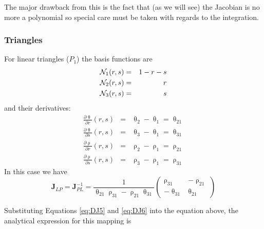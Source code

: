 The major drawback from this is the fact that (as we will see) the Jacobian is no more a polynomial
so special care must be taken with regards to the integration.

\subsubsection{Triangles}

For linear triangles ($P_1$) the basis functions are
\begin{eqnarray}
{\mathcal{N}}_1(r,s)&=&1-r-s \\
{\mathcal{N}}_2(r,s)&=&r \\
{\mathcal{N}}_3(r,s)&=&s
\end{eqnarray}
and their derivatives:
\begin{eqnarray}
\frac{\partial\uptheta}{\partial r}(r,s) &=& \uptheta_2-\uptheta_1 = \uptheta_{21}\\
\frac{\partial\uptheta}{\partial s}(r,s) &=& \uptheta_3-\uptheta_1 = \uptheta_{31}\\
\frac{\partial\uprho}{\partial r}(r,s) &=& \uprho_2-\uprho_1 = \uprho_{21}\\
\frac{\partial\uprho}{\partial s}(r,s) &=& \uprho_3-\uprho_1 = \uprho_{31}
\end{eqnarray}
In this case we have 
\begin{equation}
\boxed{
{\bm J}_{LP}={\bm J}_{PL}^{-1} = \frac{1}{\uptheta_{21}\uprho_{31}-\uprho_{21}\uptheta_{31}} 
\left(
\begin{array}{cc}
\uprho_{31} & -\uprho_{21} \\
-\uptheta_{31} & \uptheta_{21}
\end{array}
\right)}
\label{eq:DJ5}
\end{equation}



Substituting Equations \eqref{eq:DJ5} and \eqref{eq:DJ6} into the equation above, the analytical expression for this mapping is

